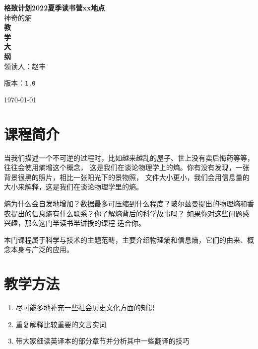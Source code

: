 \documentclass[12pt]{ctexart}
\def\version{1.0}
\newenvironment{smaller}{\zihao{5}}{\zihao{-4}}
\begin{document}
\begin{titlepage}
\begin{center}
    \vspace{-0.5in}
    \textmd{\textbf{\huge{格致计划2022夏季读书营xx地点}}}\\
    \normalsize\vspace{0.1in}\Large{神奇的熵}\\
    \vspace{0.8in}
     \textbf{\huge{教}}\\
    \vspace{0.8in}
     \textbf{\huge{学}}\\
    \vspace{0.8in}
     \textbf{\huge{大}}\\
    \vspace{0.8in}
    \textbf{\huge{纲}}\\
    \vspace{0.8in}
    领读人：赵丰
\vspace{0.2in}
\begin{smaller}

版本：\texttt{\version}

\today
\end{smaller}
\end{center}
\end{titlepage}
\thispagestyle{empty}
\pagebreak
\pagestyle{runningpage}

\section{课程简介}
当我们描述一个不可逆的过程时，比如越来越乱的屋子、世上没有卖后悔药等等，往往会使用熵增这个概念，
这是我们在谈论物理学上的熵。你有没有发现，一张背景很黑的照片，相比一张阳光下的景物照，
文件大小更小，我们会用信息量的大小来解释，这是我们在谈论物理学里的熵。

熵为什么会自发地增加？数据最多可压缩到什么程度？玻尔兹曼提出的物理熵和香农提出的信息熵有什么联系？你了解熵背后的科学故事吗？
如果你对这些问题感兴趣，那么这门半读书半讲授的课程
适合你。

本门课程属于科学与技术的主题范畴，主要介绍物理熵和信息熵，它们的由来、概念本身与广泛的应用。

\section{教学方法}

\begin{enumerate}
\item 尽可能多地补充一些社会历史文化方面的知识
\item 重复解释比较重要的文言实词
\item 带大家细读英译本的部分章节并分析其中一些翻译的技巧
\end{enumerate}
\end{document}
